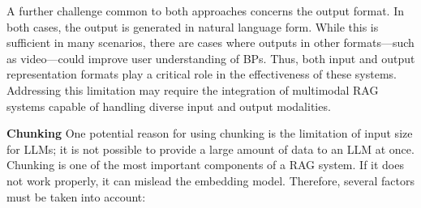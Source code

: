 \documentclass[%
    paper=A4,                    %
    twoside=true,               %
    openright,                  %
    parskip=full,               %
    chapterprefix=true,         %
    11pt,                       %
    headings=normal,            %
    bibliography=totoc,         %
    listof=totoc,              %
    titlepage=on,              %
    captions=tableabove,        %
    draft=false,               %
]{scrreprt}%
\begin{document}
   A further challenge common to both approaches concerns the output format. In both cases, the output is generated in natural language form. While this is sufficient in many scenarios, there are cases where outputs in other formats—such as video—could improve user understanding of BPs.
   Thus, both input and output representation formats play a critical role in the effectiveness of these systems. Addressing this limitation may require the integration of multimodal RAG systems \cite{yu2024visrag} capable of handling diverse input and output modalities.
  
    
   \textbf{Chunking}\hspace{0.5em}
   One potential reason for using chunking is the limitation of input size for LLMs; it is not possible to provide a large amount of data to an LLM at once.
   Chunking is one of the most important components of a RAG system. If it does not work properly, it can mislead the embedding model. Therefore, several factors must be taken into account:
\end{document}
